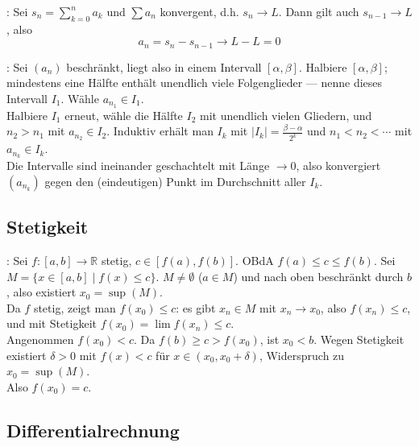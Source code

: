 \Bew {}: Sei $s_n = \sum_{k=0}^n a_k$ und $\sum a_n$ konvergent, d.h. $s_n \to L$.
Dann gilt auch $s_{n-1} \to L$, also
$$a_n = s_n - s_{n-1} \to L - L = 0$$

\begin{minipage}{\linewidth}
\Bew {}: Sei $(a_n)$ beschränkt, liegt also in einem Intervall $[\alpha, \beta]$.
Halbiere $[\alpha, \beta]$; mindestens eine Hälfte enthält unendlich viele Folgenglieder --- nenne dieses Intervall $I_1$. Wähle $a_{n_1} \in I_1$. \\
Halbiere $I_1$ erneut, wähle die Hälfte $I_2$ mit unendlich vielen Gliedern, und $n_2 > n_1$ mit $a_{n_2} \in I_2$.
Induktiv erhält man $I_k$ mit $|I_k| = \frac{\beta - \alpha}{2^k}$ und $n_1 < n_2 < \cdots$ mit $a_{n_k} \in I_k$. \\
Die Intervalle sind ineinander geschachtelt mit Länge $\to 0$, also konvergiert $(a_{n_k})$ gegen den (eindeutigen) Punkt im Durchschnitt aller $I_k$.
\end{minipage}

\subsection{Stetigkeit}

\begin{minipage}{\linewidth}
\Bew {}: Sei $f : [a,b] \to \mathbb{R}$ stetig, $c \in [f(a), f(b)]$. OBdA $f(a) \le c \le f(b)$.
Sei $M = \{x \in [a,b] \mid f(x) \le c\}$. $M \neq \emptyset$ ($a \in M$) und nach oben beschränkt durch $b$, also existiert $x_0 = \sup(M)$. \\
Da $f$ stetig, zeigt man $f(x_0) \le c$: es gibt $x_n \in M$ mit $x_n \to x_0$, also $f(x_n) \le c$, und mit Stetigkeit $f(x_0) = \lim f(x_n) \le c$. \\
Angenommen $f(x_0) < c$. Da $f(b) \ge c > f(x_0)$, ist $x_0 < b$. Wegen Stetigkeit existiert $\delta > 0$ mit $f(x) < c$
für $x \in (x_0, x_0 + \delta)$, Widerspruch zu $x_0 = \sup(M)$. \\
Also $f(x_0) = c$.
\end{minipage}

\subsection{Differentialrechnung}

